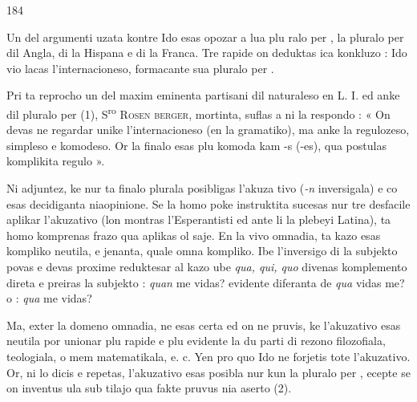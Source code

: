 \begin{VUpage}[188]{184}

Un del argumenti uzata kontre Ido esas opozar a lua plu\cc
ralo per , la pluralo per  dil Angla, di la Hispana e di\nl
la Franca. Tre rapide on deduktas ica konkluzo : Ido vio\cc
lacas l'internacioneso, formacante sua pluralo per .

Pri ta reprocho un del maxim eminenta partisani dil\nl
naturaleso en L. I. ed anke dil pluralo per  (1), S\textsuperscript{ro} \textsc{Rosen}\cc
\textsc{berger}, mortinta, suflas a ni la respondo : « On devas ne\nl
regardar unike l'internacioneso (en la gramatiko), ma anke\nl
la regulozeso, simpleso e komodeso. Or la finalo  esas plu\nl
komoda kam -s (-es), qua postulas komplikita regulo ».

Ni adjuntez, ke nur ta finalo plurala posibligas l'akuza\cc
tivo (\textit{-n} inversigala) e co esas decidiganta niaopinione. Se\nl
la homo poke instruktita sucesas nur tre desfacile aplikar\nl
l'akuzativo (lon montras l'Esperantisti ed ante li la plebeyi\nl
Latina), ta homo komprenas frazo qua aplikas ol saje. En\nl
la vivo omnadia, ta kazo esas kompliko neutila, e jenanta,\nl
quale omna kompliko. Ibe l'inversigo di la subjekto povas\nl
e devas proxime reduktesar al kazo ube \textit{qua, qui, quo} divenas\nl
komplemento direta e preiras la subjekto : \textit{quan} me vidas?\nl
evidente diferanta de \textit{qua} vidas me? o : \textit{qua} me vidas?

Ma, exter la domeno omnadia, ne esas certa ed on ne\nl
pruvis, ke l'akuzativo esas neutila por unionar plu rapide\nl
e plu evidente la du parti di rezono filozofiala, teologiala,\nl
o mem matematikala, e. c. Yen pro quo Ido ne forjetis tote\nl
l'akuzativo. Or, ni lo dicis e repetas, l'akuzativo esas posibla\nl
nur kun la pluralo per , ecepte se on inventus ula sub\cc
tilajo qua fakte pruvus nia aserto (2).
\end{VUpage}

